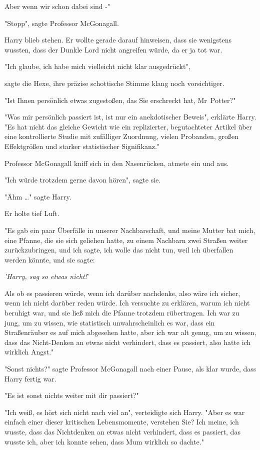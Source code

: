 {Aber wenn wir schon dabei sind -"

"Stopp", sagte Professor McGonagall.

Harry blieb stehen. Er wollte gerade darauf hinweisen, dass sie wenigstens wussten, dass der Dunkle Lord nicht angreifen würde, da er ja tot war.

"Ich glaube, ich habe mich vielleicht nicht klar ausgedrückt",

sagte die Hexe, ihre präzise schottische Stimme klang noch vorsichtiger.

"Ist Ihnen persönlich etwas zugestoßen, das Sie erschreckt hat, Mr~Potter?"

"Was mir persönlich passiert ist, ist nur ein anekdotischer Beweis", erklärte Harry. "Es hat nicht das gleiche Gewicht wie ein replizierter, begutachteter Artikel über eine kontrollierte Studie mit zufälliger Zuordnung, vielen Probanden, großen Effektgrößen und starker statistischer Signifikanz."

Professor McGonagall kniff sich in den Nasenrücken, atmete ein und aus.

"Ich würde trotzdem gerne davon hören", sagte sie.

"Ähm …" sagte Harry.

Er holte tief Luft.

"Es gab ein paar Überfälle in unserer Nachbarschaft, und meine Mutter bat mich, eine Pfanne, die sie sich geliehen hatte, zu einem Nachbarn zwei Straßen weiter zurückzubringen, und ich sagte, ich wolle das nicht tun, weil ich überfallen werden könnte, und sie sagte:

\emph{'Harry, sag so etwas nicht!}'

Als ob es passieren würde, wenn ich darüber nachdenke, also wäre ich sicher, wenn ich nicht darüber reden würde. Ich versuchte zu erklären, warum ich nicht beruhigt war, und sie ließ mich die Pfanne trotzdem rübertragen. Ich war zu jung, um zu wissen, wie statistisch unwahrscheinlich es war, dass ein Straßenräuber es auf mich abgesehen hatte, aber ich war alt genug, um zu wissen, dass das Nicht-Denken an etwas nicht verhindert, dass es passiert, also hatte ich wirklich Angst."

"Sonst nichts?" sagte Professor McGonagall nach einer Pause, als klar wurde, dass Harry fertig war.

"Es ist sonst nichts weiter mit dir passiert?"

"Ich weiß, es hört sich nicht nach viel an", verteidigte sich Harry. "Aber es war einfach einer dieser kritischen Lebensmomente, verstehen Sie? Ich meine, ich wusste, dass das Nichtdenken an etwas nicht verhindert, dass es passiert, das wusste ich, aber ich konnte sehen, dass Mum wirklich so dachte."

}

